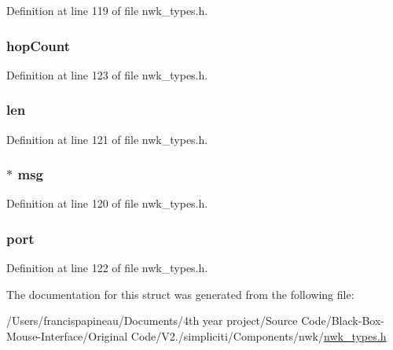 \-Definition at line 119 of file nwk\-\_\-types.\-h.

\hypertarget{structioctlRawReceive__t_a95f97d42c2a291fbda2d2b4e82e12391}{
\subsubsection[{hop\-Count}]{ {\bf hop\-Count}}}\label{structioctlRawReceive__t_a95f97d42c2a291fbda2d2b4e82e12391}


\-Definition at line 123 of file nwk\-\_\-types.\-h.

\hypertarget{structioctlRawReceive__t_a5723e60ffd628510c699eddbce90be23}{
\subsubsection[{len}]{ {\bf len}}}\label{structioctlRawReceive__t_a5723e60ffd628510c699eddbce90be23}


\-Definition at line 121 of file nwk\-\_\-types.\-h.

\hypertarget{structioctlRawReceive__t_a8dd37bf01473e324d7c15a19fd211de9}{
\subsubsection[{msg}]{$\ast$ {\bf msg}}}\label{structioctlRawReceive__t_a8dd37bf01473e324d7c15a19fd211de9}


\-Definition at line 120 of file nwk\-\_\-types.\-h.

\hypertarget{structioctlRawReceive__t_a2fa54f9024782843172506fadbee2ac8}{
\subsubsection[{port}]{ {\bf port}}}\label{structioctlRawReceive__t_a2fa54f9024782843172506fadbee2ac8}


\-Definition at line 122 of file nwk\-\_\-types.\-h.



\-The documentation for this struct was generated from the following file\-:\begin{DoxyCompactItemize}
\item 
/\-Users/francispapineau/\-Documents/4th year project/\-Source Code/\-Black-\/\-Box-\/\-Mouse-\/\-Interface/\-Original Code/\-V2./simpliciti/\-Components/nwk/\hyperlink{nwk__types_8h}{nwk\-\_\-types.\-h}\end{DoxyCompactItemize}
